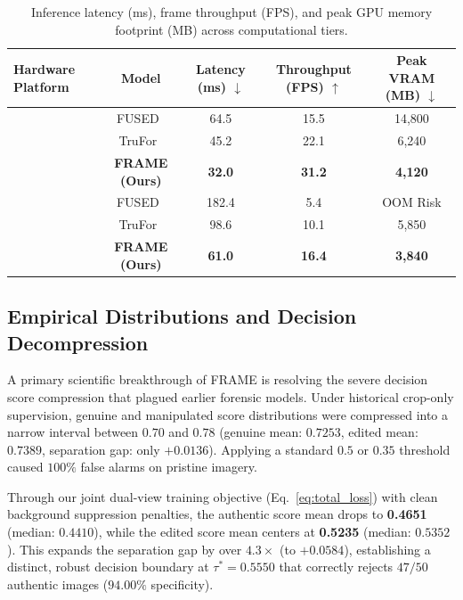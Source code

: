\begin{table}[t]
\centering\small
\caption{Inference latency (ms), frame throughput (FPS), and peak GPU memory footprint (MB) across computational tiers.}
\label{tab:hardware_profile}
\setlength{\tabcolsep}{4pt}
\renewcommand{\arraystretch}{1.15}
\begin{tabular*}{\textwidth}{@{\extracolsep{\fill}}lcccc@{}}
\toprule
Hardware Platform & Model & Latency (ms) $\downarrow$ & Throughput (FPS) $\uparrow$ & Peak VRAM (MB) $\downarrow$ \\
\midrule
{} 
& FUSED~\cite{fused} & 64.5 & 15.5 & 14,800 \\
& TruFor~\cite{trufor} & 45.2 & 22.1 & 6,240 \\
& \textbf{FRAME (Ours)} & \textbf{32.0} & \textbf{31.2} & \textbf{4,120} \\
\midrule
{} 
& FUSED~\cite{fused} & 182.4 & 5.4 & OOM Risk \\
& TruFor~\cite{trufor} & 98.6 & 10.1 & 5,850 \\
& \textbf{FRAME (Ours)} & \textbf{61.0} & \textbf{16.4} & \textbf{3,840} \\
\bottomrule
\end{tabular*}
\end{table}

\subsection{Empirical Distributions and Decision Decompression}
\label{sec:empirical_distributions}

A primary scientific breakthrough of FRAME is resolving the severe decision score compression that plagued earlier forensic models. Under historical crop-only supervision, genuine and manipulated score distributions were compressed into a narrow interval between $0.70$ and $0.78$ (genuine mean: $0.7253$, edited mean: $0.7389$, separation gap: only $+0.0136$). Applying a standard $0.5$ or $0.35$ threshold caused $100\%$ false alarms on pristine imagery.

Through our joint dual-view training objective (Eq.~\eqref{eq:total_loss}) with clean background suppression penalties, the authentic score mean drops to \textbf{0.4651} (median: $0.4410$), while the edited score mean centers at \textbf{0.5235} (median: $0.5352$). This expands the separation gap by over \textbf{$4.3\times$} (to $+0.0584$), establishing a distinct, robust decision boundary at $\tau^* = 0.5550$ that correctly rejects $47/50$ authentic images ($94.00\%$ specificity).

